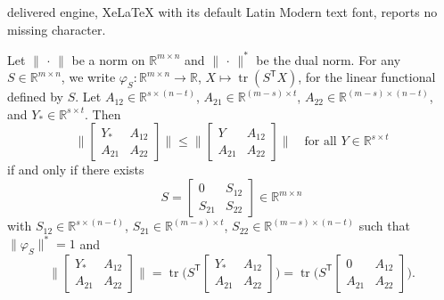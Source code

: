 \documentclass[10pt,a4paper]{amsart}
\DeclareMathOperator{\tr}{tr}
\newcommand{\R}{\mathbb{R}}
\newcommand{\tp}{{\scriptscriptstyle\mathsf{T}}}
\begin{document}
delivered engine, XeLaTeX with its default Latin Modern text font, reports no missing character.
\begin{proposition}\label{prop:complete}
Let $\lVert\,\cdot\,\rVert$ be a norm on $\R^{m\times n}$ and $\lVert\,\cdot\,\rVert^*$ be the dual norm. For any $S \in \R^{m \times n}$, we write $\varphi_S : \R^{m \times n} \to \R$, $X \mapsto \tr(S^\tp X)$, for the linear functional defined by $S$. Let $A_{12}\in \R^{s \times (n-t)}$, $A_{21}\in \R^{(m-s) \times t}$, $A_{22}\in \R^{(m-s) \times (n-t)}$, and $Y_* \in \R^{s \times t}$. 
Then
\[
\biggl\lVert \begin{bmatrix}
    Y_* & A_{12} \\
A_{21} & A_{22}
\end{bmatrix} \biggr\rVert \le \biggl\lVert \begin{bmatrix}
    Y & A_{12} \\
A_{21} & A_{22}
\end{bmatrix} \biggr\rVert \quad \text{for all } Y \in \R^{s \times t}
\]  if and only if there exists 
\begin{equation}\label{eq:R_form}
    S= \begin{bmatrix}
    0 & S_{12} \\
S_{21} & S_{22}
\end{bmatrix} \in \R^{m \times n}
\end{equation}
with $S_{12}\in \R^{s \times (n-t)}$, $S_{21}\in \R^{(m-s) \times t}$, $S_{22}\in \R^{(m-s) \times (n-t)}$ such that $\lVert \varphi_S \rVert^*=1$ and 
\begin{equation}\label{eq:completion_thm}
    \biggl\lVert \begin{bmatrix}
        Y_* & A_{12} \\
    A_{21} & A_{22}
    \end{bmatrix} \biggr\rVert = \tr\biggl(S^\tp \begin{bmatrix}
        Y_* & A_{12} \\
    A_{21} & A_{22}
    \end{bmatrix} \biggr) = \tr \biggl( S^\tp  \begin{bmatrix}
        0 & A_{12} \\
    A_{21} & A_{22}
    \end{bmatrix}  \biggr).
\end{equation}
\end{proposition}
\end{document}
